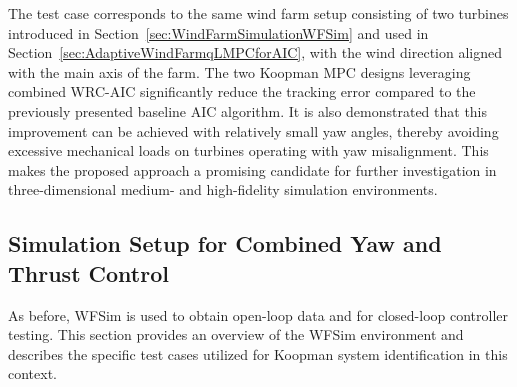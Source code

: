 The test case corresponds to the same wind farm setup consisting of two turbines introduced in Section~\ref{sec:WindFarmSimulationWFSim} and used in Section~\ref{sec:AdaptiveWindFarmqLMPCforAIC}, with the wind direction aligned with the main axis of the farm. The two Koopman MPC designs leveraging combined WRC-AIC significantly reduce the tracking error compared to the previously presented baseline AIC algorithm. It is also demonstrated that this improvement can be achieved with relatively small yaw angles, thereby avoiding excessive mechanical loads on turbines operating with yaw misalignment. This makes the proposed approach a promising candidate for further investigation in three-dimensional medium- and high-fidelity simulation environments.

\subsection{Simulation Setup for Combined Yaw and Thrust Control} \label{WakeModel} 
As before, WFSim is used to obtain open-loop data and for closed-loop controller testing. This section provides an overview of the WFSim environment and describes the specific test cases utilized for Koopman system identification in this context.

